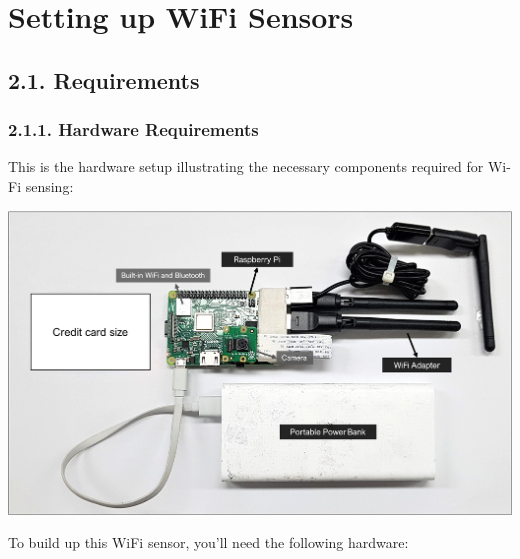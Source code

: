 \documentclass[
  letterpaper,
  DIV=11,
  numbers=noendperiod]{scrreprt}
\begin{document}

\hypertarget{section}{%
\chapter{}\label{section}}

\part{Setting up WiFi Sensors}

\hypertarget{requirements}{%
\chapter*{2.1. Requirements}\label{requirements}}


\hypertarget{hardware-requirements}{%
\section*{2.1.1. Hardware Requirements}\label{hardware-requirements}}


This is the hardware setup illustrating the necessary components
required for Wi-Fi sensing:

\includegraphics{content/material/ch2/sensor-comp.png}

To build up this WiFi sensor, you'll need the following hardware:
\end{document}

